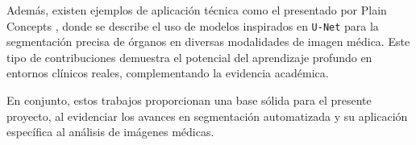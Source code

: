 Además, existen ejemplos de aplicación técnica como el presentado por Plain Concepts \cite{plain2021}, donde se describe el uso de modelos inspirados en \texttt{U-Net} para la segmentación precisa de órganos en diversas modalidades de imagen médica. Este tipo de contribuciones demuestra el potencial del aprendizaje profundo en entornos clínicos reales, complementando la evidencia académica.

En conjunto, estos trabajos proporcionan una base sólida para el presente proyecto, al evidenciar los avances en segmentación automatizada y su aplicación específica al análisis de imágenes médicas.

